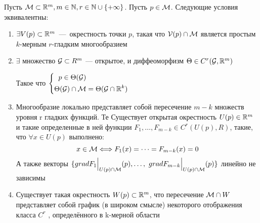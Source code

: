 \begin{theorem}
Пусть $\mathcal{M} \subset \mathbb{R}^m, m \in \mathbb{N}, r \in \mathbb{N} \cup \{+ \infty \}$. Пусть $p \in \mathcal{M}$.
Следующие условия эквивалентны: 
\begin{enumerate}
    \item $\exists V(p) \subset \mathbb{R}^m$~---~окрестность точки $p$, такая что $\mathcal{V}(p) \cap \mathcal{M}$ является простым $k$-мерным $r$-гладким многообразием 
    \item $\exists$ множество $\mathcal{G} \subset R^m$ — открытое, и диффеоморфизм $\Theta \in C^{r}(\mathcal{G}, \mathbb{R}^m)$
    
    Такое что 
$
\left\{ \begin{aligned} 
  p \in \Theta(\mathcal{G})\\
  \Theta(\mathcal{G}) \cap \mathcal{M} &= \Theta(\mathcal{G} \cap \mathbb{R}^k)
\end{aligned} \right.
$
    \item Многообразие локально представляет собой пересечение $m - k$ множеств уровня r гладких функций. Те Существует открытая окрестность $U(p) \in \mathbb{R}^m$ и такие определенные в ней функции $F_{1}, \dots , F_{m-k} \in C^{r}(U(p), R)$, такие, что $\forall x \in U(p)$ выполнено:
    $$x \in \mathcal{M} \Longleftrightarrow F_{1}(x) = \dots = F_{m-k}(x) = 0$$
    А также векторы $\{grad F_1\Bigr|_{U(p) \cap \mathcal{M}}(p),\dots, \ grad F_{m-k}\Bigr|_{U(p) \cap \mathcal{M}}(p)\}$ линейно не зависимы
    \item Существует такая окрестность $W(p) \subset \mathbb{R}^m$, что пересечение $\mathcal{M} \cap W$ представляет собой график (в широком смысле) некоторого отображения класса $C^r$ , определённого в k-мерной области
\end{enumerate}
\end{theorem}

